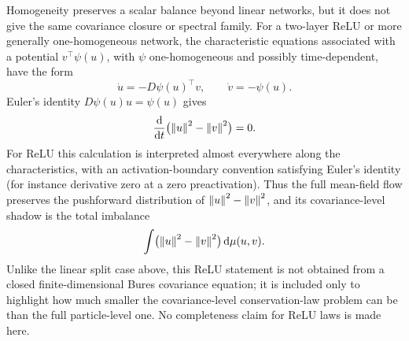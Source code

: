 Homogeneity preserves a scalar balance beyond linear networks, but it
does not give the same covariance closure or spectral family.
For a two-layer ReLU or more generally one-homogeneous network, the characteristic
equations associated with a potential \(v^\top\psi(u)\), with \(\psi\) one-homogeneous
and possibly time-dependent,
have the form
\[
\dot u=-D\psi(u)^\top v,\qquad \dot v=-\psi(u).
\]
Euler's identity \(D\psi(u)u=\psi(u)\) gives
\[
\frac{\mathrm{d}}{\mathrm{d}t}\bigl(\left\lVert u \right\rVert^2-\left\lVert v \right\rVert^2\bigr)=0.
\]
For ReLU this calculation is interpreted almost everywhere along the
characteristics, with an activation-boundary convention satisfying Euler's
identity (for instance derivative zero at a zero preactivation).
Thus the full mean-field flow preserves the pushforward distribution of
\(\left\lVert u \right\rVert^2-\left\lVert v \right\rVert^2\), and its covariance-level shadow is the total imbalance
\[
\int\bigl(\left\lVert u \right\rVert^2-\left\lVert v \right\rVert^2\bigr)\,\mathrm{d}\mu(u,v).
\]
Unlike the linear split case above, this ReLU statement is not obtained from a
closed finite-dimensional Bures covariance equation; it is included only to
highlight how much smaller the covariance-level conservation-law problem can be
than the full particle-level one. No completeness claim for ReLU laws is
made here.

